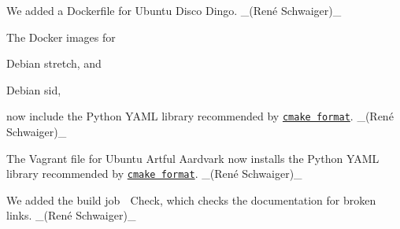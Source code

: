 \begin{DoxyItemize}
\item We added a Dockerfile for Ubuntu Disco Dingo. \+\_\+(René Schwaiger)\+\_\+
\end{DoxyItemize}


\begin{DoxyItemize}
\item The Docker images for
\begin{DoxyItemize}
\item Debian stretch, and
\item Debian sid,
\end{DoxyItemize}

now include the Python Y\+A\+ML library recommended by \href{https://github.com/cheshirekow/cmake_format}{\tt cmake format}. \+\_\+(René Schwaiger)\+\_\+
\end{DoxyItemize}


\begin{DoxyItemize}
\item The Vagrant file for Ubuntu Artful Aardvark now installs the Python Y\+A\+ML library recommended by \href{https://github.com/cheshirekow/cmake_format}{\tt cmake format}. \+\_\+(René Schwaiger)\+\_\+
\end{DoxyItemize}


\begin{DoxyItemize}
\item We added the build job {\ttfamily 🔗 Check}, which checks the documentation for broken links. \+\_\+(René Schwaiger)\+\_\+
\end{DoxyItemize}


